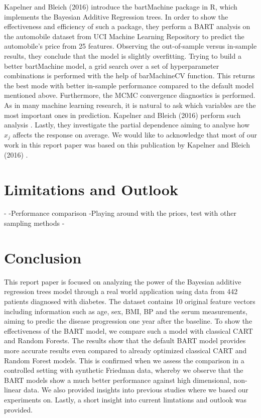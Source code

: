 \documentclass{usiinftr}
\begin{document}
Kapelner and Bleich (2016) \cite{14} introduce the bartMachine package in R, which implements the Bayesian Additive Regression trees.  In order to show the effectiveness and efficiency of such a package, they perform a BART analysis on the automobile dataset from UCI Machine Learning Repository to predict the automobile's price from 25 features. Observing the out-of-sample versus in-sample results, they conclude that the model is slightly overfitting. Trying to build a better bartMachine model, a grid search over a set of hyperparameter combinations is performed with the help of barMachineCV function. This returns the best mode with better in-sample performance compared to the default model mentioned above. Furthermore, the MCMC convergence diagnostics is performed. As in many machine learning research, it is natural to ask which variables are the most important ones in prediction. Kapelner and Bleich (2016) perform such analysis \cite{14}. Lastly, they investigate the partial dependence aiming to analyse how $x_j$ affects the response on average. We would like to acknowledge that most of our work in this report paper was based on this publication by Kapelner and Bleich (2016) \cite{14}. 

\section{Limitations and Outlook}
-
-Performance comparison 
-Playing around with the priors, test with other sampling methods
-
\section{Conclusion}
This report paper is focused on analyzing the power of the Bayesian additive regression trees model through a real world application using data from 442 patients diagnosed with diabetes. The dataset contains 10 original feature vectors including information such as age, sex, BMI, BP and the serum measurements, aiming to predic the disease progression one year after the baseline. To show the effectiveness of the BART model, we compare such a model with classical CART and Random Forests. The results show that the default BART model provides more accurate results even compared to already optimized classical CART and Random Forest models. This is confirmed when we assess the comparison in a controlled setting with synthetic Friedman data, whereby we observe that the BART models show a much better performance against high dimensional, non-linear data. We also provided insights into previous studies where we based our experiments on. Lastly, a short insight into current limtations and outlook was provided.
\end{document}
